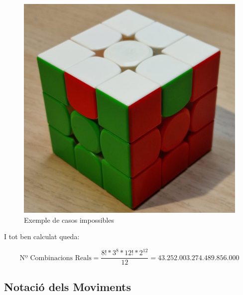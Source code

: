 \begin{figure}[ht]
\begin{minipage}[b]{0.2\textwidth}
    \end{minipage}
    \hfill
    \begin{minipage}[b]{0.2\textwidth}
        \includegraphics[width=\textwidth]{img/figures/impossible-2edge.jpg}
    \end{minipage}
    \caption{Exemple de casos impossibles}
  \end{figure}
I tot ben calculat queda:

$$ \textrm{Nº Combinacions Reals} = \frac{8!*3^8*12!*2^{12}}{12}= 43.252.003.274.489.856.000 $$

\subsection{Notació dels Moviments}

